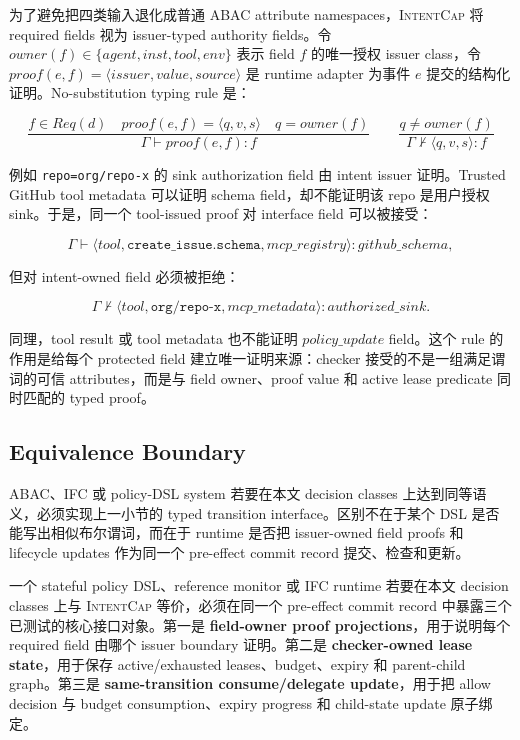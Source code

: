 \documentclass[UTF8,a4paper,11pt]{ctexart}
\newcommand{\sys}{\textsc{IntentCap}\xspace}
\begin{document}
为了避免把四类输入退化成普通 ABAC attribute namespaces，\sys 将 required fields 视为 issuer-typed authority fields。令 \(owner(f)\in\{agent,inst,tool,env\}\) 表示 field \(f\) 的唯一授权 issuer class，令 \(proof(e,f)=\langle issuer,value,source\rangle\) 是 runtime adapter 为事件 \(e\) 提交的结构化证明。No-substitution typing rule 是：

\[
\frac{f \in Req(d) \quad proof(e,f)=\langle q,v,s\rangle \quad q = owner(f)}
     {\Gamma \vdash proof(e,f) : f}
\qquad
\frac{q \neq owner(f)}
     {\Gamma \nvdash \langle q,v,s\rangle : f}
\]

例如 \texttt{repo=org/repo-x} 的 sink authorization field 由 intent issuer 证明。Trusted GitHub tool metadata 可以证明 schema field，却不能证明该 repo 是用户授权 sink。于是，同一个 tool-issued proof 对 interface field 可以被接受：

\[
\Gamma \vdash \langle tool,\texttt{create\_issue.schema},mcp\_registry\rangle : github\_schema ,
\]

但对 intent-owned field 必须被拒绝：

\[
\Gamma \nvdash \langle tool,\texttt{org/repo-x},mcp\_metadata\rangle : authorized\_sink .
\]

同理，tool result 或 tool metadata 也不能证明 \(policy\_update\) field。这个 rule 的作用是给每个 protected field 建立唯一证明来源：checker 接受的不是一组满足谓词的可信 attributes，而是与 field owner、proof value 和 active lease predicate 同时匹配的 typed proof。

\subsection{Equivalence Boundary}

ABAC、IFC 或 policy-DSL system 若要在本文 decision classes 上达到同等语义，必须实现上一小节的 typed transition interface。区别不在于某个 DSL 是否能写出相似布尔谓词，而在于 runtime 是否把 issuer-owned field proofs 和 lifecycle updates 作为同一个 pre-effect commit record 提交、检查和更新。

一个 stateful policy DSL、reference monitor 或 IFC runtime 若要在本文 decision classes 上与 \sys 等价，必须在同一个 pre-effect commit record 中暴露三个已测试的核心接口对象。第一是 \textbf{field-owner proof projections}，用于说明每个 required field 由哪个 issuer boundary 证明。第二是 \textbf{checker-owned lease state}，用于保存 active/exhausted leases、budget、expiry 和 parent-child graph。第三是 \textbf{same-transition consume/delegate update}，用于把 allow decision 与 budget consumption、expiry progress 和 child-state update 原子绑定。
\end{document}

